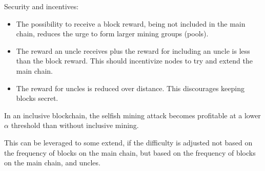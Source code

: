\begin{note}
Security and incentives:
\begin{itemize}
	\item The possibility to receive a block reward, being not included in the main chain, reduces the urge to form larger mining groups (pools).
	\item The reward an uncle receives plus the reward for including an uncle is less than the block reward. This should incentivize nodes to try and extend the main chain.
	\item The reward for uncles is reduced over distance. This discourages keeping blocks secret. 
\end{itemize}
\end{note}


\begin{theorem} 
In an inclusive blockchain, the selfish mining attack becomes profitable at a lower $\alpha$ threshold than without inclusive mining.

This can be leveraged to some extend, if the difficulty is adjusted not based on the frequency of blocks on the main chain, but based on the frequency of blocks on the main chain, and uncles.
\end{theorem}
